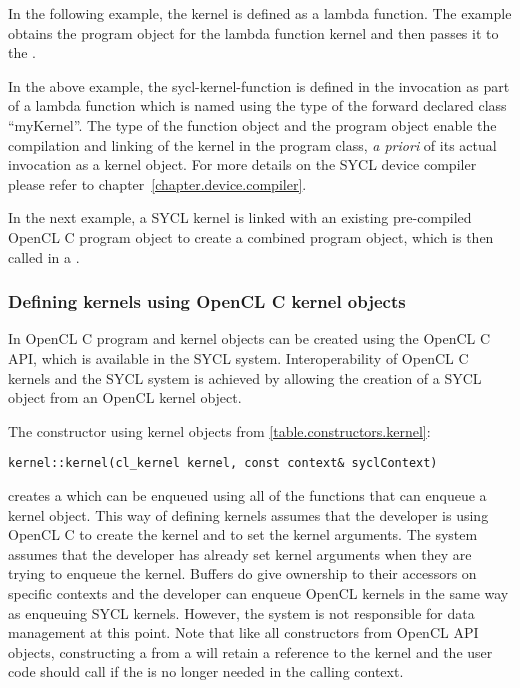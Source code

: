 In the following example, the kernel is defined as a lambda function.
The example obtains the program object for the lambda function kernel
and then passes it to the .


In the above example, the \gls{sycl-kernel-function} is defined in the
 invocation as part of a lambda function which is named
using the type of the forward declared class ``myKernel''. The type of the
function object and the program object enable the compilation and linking of the kernel
in the program class, \emph{a priori} of its actual invocation as a kernel
object. For more details on the SYCL device compiler please refer to
chapter~\ref{chapter.device.compiler}.

In the next example, a SYCL kernel is linked with an existing pre-compiled
OpenCL C program object to create a combined program object, which is then
called in a .


\subsubsection{Defining kernels using OpenCL C kernel objects}
\label{sec:interfaces.kernels.opencl.objects}

In OpenCL C \cite{opencl12} program and kernel objects can be created
using the OpenCL C API, which is available in the SYCL
system. Interoperability of OpenCL C kernels and the SYCL system is
achieved by allowing the creation of a SYCL  object from
an OpenCL \gls{kernel} object.

The constructor using kernel objects from \ref{table.constructors.kernel}:
\begin{lstlisting}[style=nonumbers]
kernel::kernel(cl_kernel kernel, const context& syclContext)
\end{lstlisting}

creates a  which can be enqueued using
all of the  functions that can enqueue a kernel object.
This way of defining kernels assumes that
the developer is using OpenCL C to create the kernel and to set the
kernel arguments. The system assumes that the developer has already
set kernel arguments when they are trying to enqueue the
kernel. Buffers do give ownership to their accessors on specific
contexts and the developer can enqueue OpenCL kernels in the same way
as enqueuing SYCL kernels.  However, the system is not responsible for
data management at this point.  Note that like all constructors from
OpenCL API objects, constructing a  from
a  will retain a reference to the kernel and the
user code should call  if the
 is no longer needed in the calling context.


